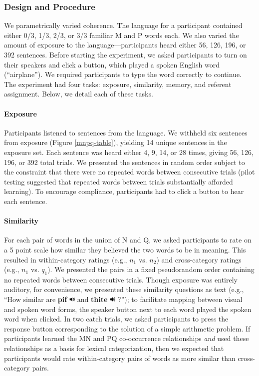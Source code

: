 \documentclass[man,floatsintext]{apa6}
\begin{document}
\subsubsection{Design and Procedure}

We parametrically varied coherence. The language for a participant contained either 0/3, 1/3, 2/3, or 3/3 familiar M and P words each. We also varied the amount of exposure to the language---participants heard either 56, 126, 196, or 392 sentences. Before starting the experiment, we asked participants to turn on their speakers and click a button, which played a spoken English word (``airplane''). We required participants to type the word correctly to continue. The experiment had four tasks: exposure, similarity, memory, and referent assignment. Below, we detail each of these tasks.

\paragraph{Exposure}
Participants listened to sentences from the language. We withheld six sentences from exposure (Figure \ref{mnpq-table}), yielding 14 unique sentences in the exposure set. Each sentence was heard either 4, 9, 14, or 28 times, giving 56, 126, 196, or 392 total trials. We presented the sentences in random order subject to the constraint that there were no repeated words between consecutive trials (pilot testing suggested that repeated words between trials substantially afforded learning). To encourage compliance, participants had to click a button to hear each sentence.

\paragraph{Similarity}
For each pair of words in the union of N and Q, we asked participants to rate on a 5 point scale how similar they believed the two words to be in meaning. This resulted in within-category ratings (e.g., $n_1$ vs. $n_2$) and cross-category ratings (e.g., $n_1$ vs. $q_1$). We presented the pairs in a fixed pseudorandom order containing no repeated words between consecutive trials. Though exposure was entirely auditory, for convenience, we presented these similarity questions as text (e.g., ``How similar are \textbf{pif} \includegraphics[width=0.3cm]{play.png} and \textbf{thite} \includegraphics[width=0.3cm]{play.png} ?''); to facilitate mapping between visual and spoken word forms, the speaker button next to each word played the spoken word when clicked. In two catch trials, we asked participants to press the response button corresponding to the solution of a simple arithmetic problem. If participants learned the MN and PQ co-occurrence relationships \emph{and} used these relationships as a basis for lexical categorization, then we expected that participants would rate within-category pairs of words as more similar than cross-category pairs.
\end{document}
